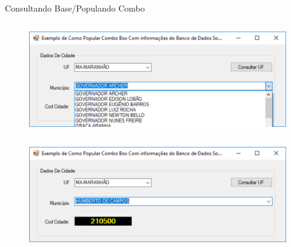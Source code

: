 \begin{frame}
\begin{CaixaModelo01}{Consultando Base/Populando Combo}
\begin{columns}
\begin{column}{0.48\textwidth}
\begin{figure}
	\label{fig:ComboComDados03}
\end{figure}
\begin{figure}
	\includegraphics[scale=.25]{./Figuras/F10_ArqCSV04.png}
	\label{fig:ComboComDados04}
\end{figure}
		\end{column}
	\end{columns}

\begin{figure}
	\includegraphics[scale=.30]{./Figuras/F10_ArqCSV05.png}
	\label{fig:ComboComDados04}
\end{figure}


\end{CaixaModelo01}
	
	\end{frame}